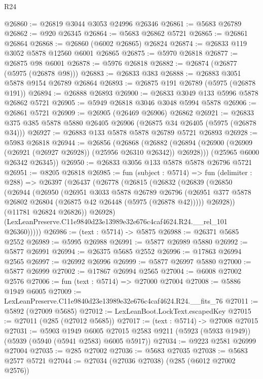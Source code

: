 \begin{lexlean}{R24}
\begin{coremodule}
@26860 := @26819 @3044 @3053 @24996 @26346
@26861 := @5683 @26789
@26862 := @920 @26345
@26864 := @5683 @26862 @5721
@26865 := @26861 @26864
@26868 := @26860 (@6002 @26865) @26824
@26874 := @26833 @119 @3052 @5878 @12560 @6001 @26865
@26875 := @5970 @26818
@26877 := @26875 @98 @6001
@26878 := @5976 @26818
@26882 := @26874 (@26877 (@5975 (@26878 @98)))
@26883 := @26833 @383
@26888 := @26883 @3051 @5878 @9154 @26789 @26864
@26893 := @26875 @191 @26789 (@5975 (@26878 @191))
@26894 := @26888 @26893
@26900 := @26833 @3049 @133 @5996 @5878 @26862 @5721
@26905 := @5949 @26818 @3046 @3048 @5994 @5878
@26906 := @26861 @5721
@26909 := @26905 (@26469 @26906) @26862
@26921 := @26833 @375 @385 @5878 @5880 @26405 @26906 (@26875 @34 @26405 (@5975 (@26878 @34)))
@26927 := @26883 @133 @5878 @5878 @26789 @5721 @26893
@26928 := @5983 @26818
@26944 := @26856
    (@26868
      (@26882 (@26894 (@26900 (@26909 (@26921 (@26927 @26928)) (@25956 @26310 @26342)) @26928)))
      (@25965 @6000 @26342 @26345))
@26950 := @26833 @3056 @133 @5878 @5878 @26796 @5721
@26951 := @8205 @26818
@26985 := fun (subject : @5714) =>
  fun (delimiter : @288) =>
  @26397
    (@26437
      (@26778
        (@26815
          (@26832
            (@26839
              (@26850
                (@26944
                  (@26950
                    (@26951
                      @3033
                      @5878
                      @26789
                      @26796
                      (@26951 @377 @5878 @26802 @26804 (@26875 @42 @26448 (@5975 (@26878 @42)))))
                    @26928))
                (@11781 @26824 @26826))
              @26928)
            (LexLeanPreserve.C11e9840d23e13989e32e676c4caf4624.R24.__rel_101 @26360)))))
@26986 := (text : @5714) -> @5875
@26988 := @26371 @5685 @2552
@26989 := @5995 @26988
@26991 := @5877 @26989 @5880
@26992 := @5877 @26991
@26994 := @26375 @5685 @2552
@26996 := @17863 @26994 @2565
@26997 := @26992 @26996
@26999 := @5877 @26997 @5880
@27000 := @5877 @26999
@27002 := @17867 @26994 @2565
@27004 := @6008 @27002 @2576
@27006 := fun (text : @5714) => @27000 @27004
@27008 := @5886 @1949 @6005
@27009 := LexLeanPreserve.C11e9840d23e13989e32e676c4caf4624.R24.__fits_76
@27011 := @5892 (@27009 @5685)
@27012 := LexLeanBoot.LockText.escapedKey
@27015 := @27011 (@285 (@27012 @5685))
@27017 := (text : @5714) -> @27008 @27015
@27031 := @5903
    @1949
    @6005
    @27015
    @2583
    @9211
    (@5923 (@5933 @1949))
    (@5939 (@5940 (@5941 @2583) @6005 @5917))
@27034 := @9223 @2581 @26999 @27004
@27035 := @285 @27002
@27036 := @5683 @27035
@27038 := @5683 @2577 @5721
@27044 := @27034 (@27036 @27038) (@285 (@6012 @27002 @2576))

\end{coremodule}
\end{lexlean}
